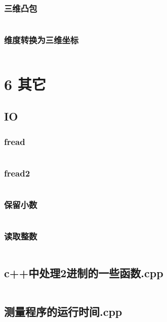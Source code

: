 \documentclass{article}
\begin{document}
\subsubsection{三维凸包}
\inputminted{c++}{/home/zzuzxy/t3/ACM-template/5 几何/3D/三维凸包.cpp}
\subsubsection{维度转换为三维坐标}
\inputminted{c++}{/home/zzuzxy/t3/ACM-template/5 几何/3D/维度转换为三维坐标.cpp}
\section{6 其它}
\subsection{IO}
\subsubsection{fread}
\inputminted{c++}{/home/zzuzxy/t3/ACM-template/6 其它/IO/fread.cpp}
\subsubsection{fread2}
\inputminted{c++}{/home/zzuzxy/t3/ACM-template/6 其它/IO/fread2.cpp}
\subsubsection{保留小数}
\inputminted{c++}{/home/zzuzxy/t3/ACM-template/6 其它/IO/保留小数.cpp}
\subsubsection{读取整数}
\inputminted{c++}{/home/zzuzxy/t3/ACM-template/6 其它/IO/读取整数.cpp}
\subsection{c++中处理2进制的一些函数.cpp}
\inputminted{c++}{/home/zzuzxy/t3/ACM-template/6 其它/c++中处理2进制的一些函数.cpp}
\subsection{测量程序的运行时间.cpp}
\inputminted{c++}{/home/zzuzxy/t3/ACM-template/6 其它/测量程序的运行时间.cpp}
\end{document}
